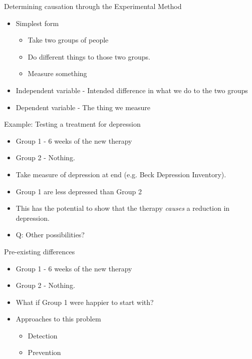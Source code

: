 \documentclass{beamer}
\begin{document}
\begin{frame}{Determining causation through the Experimental Method}
\begin{itemize}
\item Simplest form
\begin{itemize}
\item Take two groups of people
\item Do different things to those two groups.
\item Measure something
\end{itemize}
\vspace{12 pt}
\item Independent variable - Intended difference in what we do to the two groups
\item Dependent variable - The thing we measure
\end{itemize}
\end{frame}


\begin{frame}{Example: Testing a treatment for depression}
\begin{itemize}
\item Group 1 - 6 weeks of the new therapy
\item Group 2 - Nothing.
\item Take measure of depression at end (e.g. Beck Depression Inventory).
\item Group 1 are less depressed than Group 2
\vspace{12 pt}
\item This has the potential to show that the therapy \emph{causes} a reduction in depression.
\item Q: Other possibilities?
\end{itemize}
\end{frame}




\begin{frame}{Pre-existing differences}
\begin{itemize}
\item Group 1 - 6 weeks of the new therapy
\item Group 2 - Nothing.
\vspace{12 pt}
\item What if Group 1 were happier to start with?
\vspace{12 pt}
\item Approaches to this problem
\begin{itemize}
\item Detection
\item Prevention
\end{itemize}
\end{itemize}
\end{frame}
\end{document}

